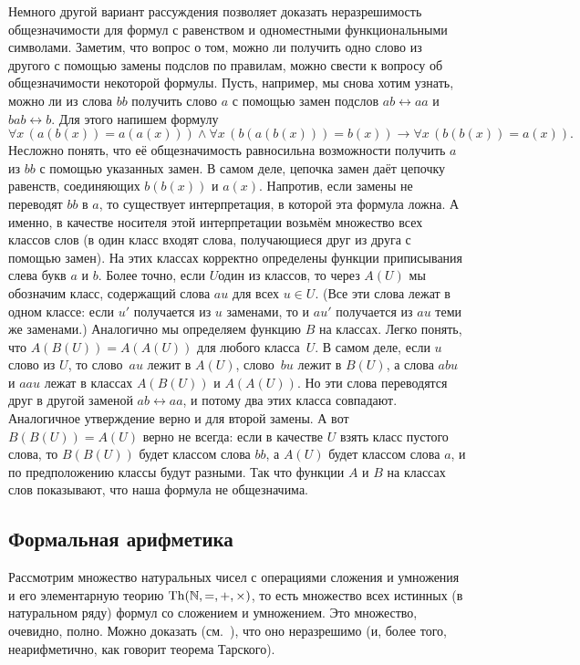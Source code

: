 Немного другой вариант рассуждения позволяет доказать
неразрешимость общезначимости для формул с равенством и
одноместными функциональными символами. Заметим, что вопрос о
том, можно ли получить одно слово из другого с помощью замены
подслов по правилам, можно свести к вопросу об общезначимости
некоторой формулы. Пусть, например, мы снова хотим узнать, можно
ли из слова $bb$ получить слово $a$ с помощью замен подслов
$ab\leftrightarrow aa$ и $bab\leftrightarrow b$. Для этого
напишем формулу
        $$
\forall x\,(a(b(x))=a(a(x))) \land
\forall x\,(b(a(b(x)))=b(x))
\to\forall x\,(b(b(x))=a(x)).
        $$
Несложно понять, что её общезначимость равносильна возможности
получить $a$ из $bb$ с помощью указанных замен. В самом деле,
цепочка замен даёт цепочку равенств, соединяющих $b(b(x))$ и
$a(x)$. Напротив, если замены не переводят $bb$ в $a$, то
существует интерпретация, в которой эта формула ложна. А именно,
в качестве носителя этой интерпретации возьмём множество всех
классов слов (в один класс входят слова, получающиеся друг из
друга с помощью замен). На этих классах корректно определены
функции приписывания слева букв $a$ и $b$. Более точно, если
$U$\т один из классов, то через $A(U)$ мы обозначим класс,
содержащий слова $au$ для всех $u\in U$. (Все эти слова лежат в
одном классе: если $u'$ получается из $u$ заменами, то и $au'$
получается из $au$ теми же заменами.) Аналогично мы определяем
функцию $B$ на классах. Легко понять, что $A(B(U))=A(A(U))$ для
любого класса~$U$. В самом деле, если $u$\т слово из $U$, то
слово~$au$ лежит в $A(U)$, слово~$bu$ лежит в $B(U)$, а слова
$abu$ и $aau$ лежат в классах $A(B(U))$ и $A(A(U))$. Но эти
слова переводятся друг в другой заменой $ab\leftrightarrow aa$,
и потому два этих класса совпадают. Аналогичное утверждение
верно и для второй замены. А вот $B(B(U))=A(U)$ верно не всегда:
если в качестве $U$ взять класс пустого слова, то $B(B(U))$
будет классом слова $bb$, а $A(U)$ будет классом слова $a$, и по
предположению классы будут разными. Так что функции $A$ и $B$ на
классах слов показывают, что наша формула не общезначима.

\subsection*{Формальная арифметика}

Рассмотрим множество натуральных чисел с операциями сложения и
умножения и его элементарную теорию
$\operatorname{Th}(\mathbb{N},{=},{+},{\times})$, то есть множество всех
истинных (в натуральном ряду) формул со сложением и умножением.
Это множество, очевидно, полно. Можно доказать
(см.~\cite{computable-functions}), что оно неразрешимо (и, более
того, неарифметично, как говорит теорема Тарского).%

